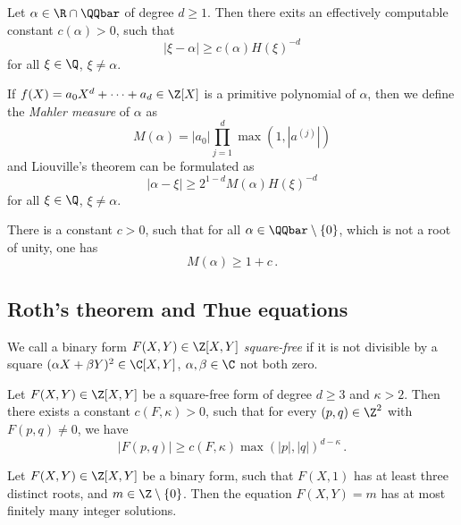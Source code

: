 \begin{thm}[Liouville, 1844]
	Let \( \alpha \in \R \cap \QQbar \) of degree \( d \geq 1 \).
	Then there exits an effectively computable constant \( c(\alpha) > 0 \), such that
	\[ |\xi - \alpha| \geq c(\alpha) H(\xi)^{-d} \]
	for all \( \xi \in \Q \), \( \xi \neq \alpha \).
\end{thm}

\begin{rem*}
	If \( f(X) = a_0 X^d + \dots + a_d \in \Z[X] \) is a primitive polynomial of \( \alpha \), then we define the \emph{Mahler measure} of \( \alpha \) as
	\[ M(\alpha) = |a_0| \prod_{j=1}^d \max (1, |a^{(j)}|) \]
	and Liouville's theorem can be formulated as
	\[ |\alpha - \xi| \geq 2^{1-d} M(\alpha) H(\xi)^{-d} \]
	for all \( \xi \in \Q \), \( \xi \neq \alpha \).
\end{rem*}

\begin{conj*}[Lehmer, 1930s]
	There is a constant \( c>0 \), such that for all \( \alpha \in \QQbar \setminus \{0\} \), which is not a root of unity, one has
	\[ M(\alpha) \geq 1 + c \,. \]
\end{conj*}


\subsection*{Roth's theorem and Thue equations}

\begin{defn*}
	We call a binary form \( F(X,Y) \in \Z[X,Y] \) \emph{square-free} if it is not divisible by a square \( (\alpha X + \beta Y)^2 \in \C[X,Y] \), \( \alpha, \beta \in \C \) not both zero.
\end{defn*}

\begin{thm}
	Let \( F(X,Y) \in \Z[X,Y] \) be a square-free form of degree \( d \geq 3 \) and \( \kappa > 2 \).
	Then there exists a constant \( c(F,\kappa) > 0 \), such that for every \( (p,q) \in \Z^2 \) with \( F(p,q) \neq 0 \), we have
	\[ |F(p,q)| \geq c(F, \kappa) \max(|p|, |q|)^{d-\kappa} \,. \]
\end{thm}

\begin{cor}
	Let \( F(X,Y) \in \Z[X,Y] \) be a binary form, such that \( F(X,1) \) has at least three distinct roots, and \( m \in \Z \setminus \{0\} \).
	Then the equation \( F(X,Y) = m \) has at most finitely many integer solutions.
\end{cor}


